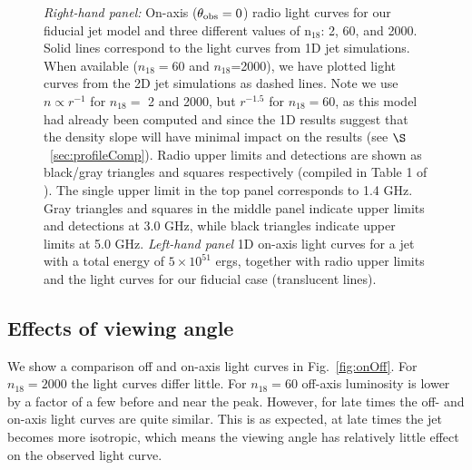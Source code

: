 \documentclass[usenatbib,fleqn]{mnras}
\begin{document}
\begin{figure}
  \caption{\label{fig:lightcurves} \textit{Right-hand panel:} On-axis
    ($\theta_{\rm obs}=0$) radio light curves for our fiducial jet
    model and three different values of n$_{18}$: 2, 60, and
    2000. Solid lines correspond to the light curves from 1D jet
    simulations. When available ($n_{18}=60$ and $n_{18}$=2000), we
    have plotted light curves from the 2D jet simulations as dashed
    lines. Note we use $n\propto r^{-1}$ for $n_{18}=$ 2 and 2000, but
    $r^{-1.5}$ for $n_{18}=60$, as this model had already been
    computed and since the 1D results suggest that the density slope
    will have minimal impact on the results (see
    $\S$~\ref{sec:profileComp}).  Radio upper limits and detections
    are shown as black/gray triangles and squares respectively
    (compiled in Table 1 of \citealt{Mimica+2015}). The single upper
    limit in the top panel corresponds to 1.4 GHz. Gray triangles and
    squares in the middle panel indicate upper limits and detections
    at 3.0 GHz, while black triangles indicate upper limits at 5.0
    GHz. \textit{Left-hand panel} 1D on-axis light curves for a jet
    with a total energy of $5\times 10^{51}$ ergs, together with radio
    upper limits and the light curves for our fiducial case
    (translucent lines).}
\end{figure}

\subsection{Effects of viewing angle}
We show a comparison off and on-axis light curves in
Fig.~\ref{fig:onOff}.  For $n_{18}=2000$ the light curves differ
little.  For $n_{18}=60$ off-axis luminosity is lower by a factor of a few
before and near the peak. However, for late times
the off- and on-axis light curves are quite similar. This is as
expected, at late times the jet becomes more isotropic, which means
the viewing angle has relatively little effect on the observed light curve.
\end{document}
